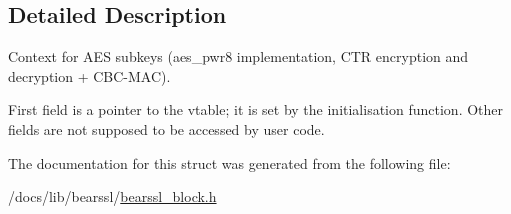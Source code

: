 \subsection{Detailed Description}
Context for A\+ES subkeys ({\ttfamily aes\+\_\+pwr8} implementation, C\+TR encryption and decryption + C\+B\+C-\/\+M\+AC). 

First field is a pointer to the vtable; it is set by the initialisation function. Other fields are not supposed to be accessed by user code. 

The documentation for this struct was generated from the following file\+:\begin{DoxyCompactItemize}
\item 
/docs/lib/bearssl/\hyperlink{bearssl__block_8h}{bearssl\+\_\+block.\+h}\end{DoxyCompactItemize}
